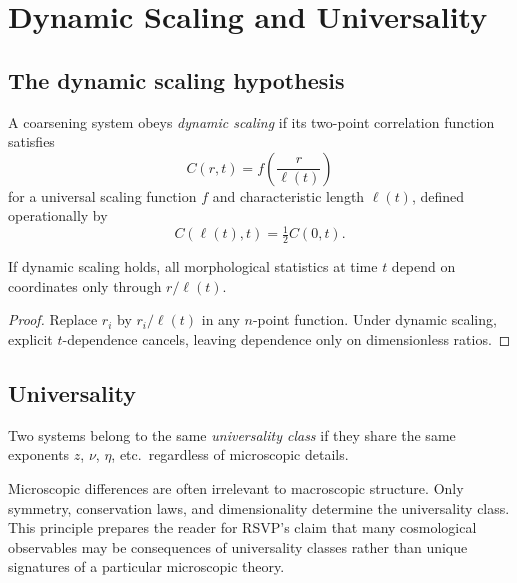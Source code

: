 
\chapter{Dynamic Scaling and Universality}
\label{ch:scaling-laws}

\section{The dynamic scaling hypothesis}

\begin{definition}
  A coarsening system obeys \emph{dynamic scaling} if
  its two-point correlation function satisfies
  \[
    C(r,t) = f\!\left(\frac{r}{\ell(t)}\right)
  \]
  for a universal scaling function $f$ and characteristic
  length $\ell(t)$, defined operationally by
  \[
    C(\ell(t),t) = \tfrac{1}{2}C(0,t).
  \]
\end{definition}

\begin{theorem}
  \label{thm:self-similar}
  If dynamic scaling holds, all morphological statistics
  at time $t$ depend on coordinates only through $r/\ell(t)$.
\end{theorem}

\begin{proof}
  Replace $r_i$ by $r_i/\ell(t)$ in any $n$-point function.
  Under dynamic scaling, explicit $t$-dependence cancels,
  leaving dependence only on dimensionless ratios.
\end{proof}

\section{Universality}

\begin{definition}
  Two systems belong to the same \emph{universality class}
  if they share the same exponents $z$, $\nu$, $\eta$, etc.\
  regardless of microscopic details.
\end{definition}

\begin{TechNote}
  Microscopic differences are often irrelevant to macroscopic
  structure.
  Only symmetry, conservation laws, and dimensionality
  determine the universality class.
  This principle prepares the reader for RSVP's claim that
  many cosmological observables may be consequences of
  universality classes rather than unique signatures of a
  particular microscopic theory.
\end{TechNote}

